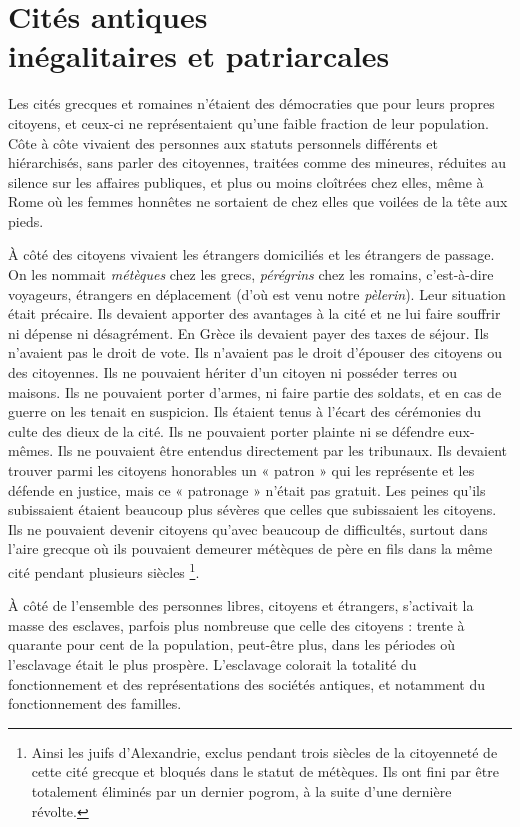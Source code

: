 
\chapter[Cités antiques inégalitaires et patriarcales]{Cités antiques\\inégalitaires et patriarcales}

Les cités grecques et romaines n'étaient des démocraties que pour
leurs propres citoyens, et ceux-ci ne représentaient qu'une faible fraction de leur
population. Côte à côte vivaient des personnes aux statuts personnels
différents et hiérarchisés, sans parler des citoyennes, traitées comme des
mineures, réduites au silence sur les affaires publiques, et plus ou moins
cloîtrées chez elles, même à Rome où les femmes honnêtes ne sortaient
de chez elles que voilées de la tête aux pieds.

À côté des citoyens vivaient les étrangers domiciliés et les étrangers
de passage. On les nommait \emph{métèques} chez les grecs, \emph{pérégrins} chez les
romains, c'est-à-dire voyageurs, étrangers en déplacement (d'où est venu
notre \emph{pèlerin}). Leur situation était précaire. Ils devaient apporter des avantages
à la cité et ne lui faire souffrir ni dépense ni désagrément. En Grèce
ils devaient payer des taxes de séjour. Ils n'avaient pas le droit de vote. Ils
n'avaient pas le droit d'épouser des citoyens ou des citoyennes. Ils ne
pouvaient hériter d'un citoyen ni posséder terres ou maisons. Ils ne pouvaient
porter d'armes, ni faire partie des soldats, et en cas de guerre on
les tenait en suspicion. Ils étaient tenus à l'écart des cérémonies du culte
des dieux de la cité. Ils ne pouvaient porter plainte ni se défendre eux-mêmes.
Ils ne pouvaient être entendus directement par les tribunaux. Ils
devaient trouver parmi les citoyens honorables un « patron » qui les représente
et les défende en justice, mais ce « patronage » n'était pas gratuit.
Les peines qu'ils subissaient étaient beaucoup plus sévères que celles
que subissaient les citoyens. Ils ne pouvaient devenir citoyens qu'avec
beaucoup de difficultés, surtout dans l'aire grecque où ils pouvaient demeurer
métèques de père en fils dans la même cité pendant plusieurs siècles%
\footnote{Ainsi
les juifs d'Alexandrie, exclus pendant trois siècles de la citoyenneté de cette cité grecque et bloqués dans le statut de métèques. Ils ont fini par être totalement éliminés par un dernier pogrom, à la suite d'une dernière révolte.}.

À côté de l'ensemble des personnes libres, citoyens et étrangers,
s'activait la masse des esclaves, parfois plus nombreuse que celle des citoyens :
 trente à quarante pour cent de la population, peut-être plus, dans
les périodes où l'esclavage était le plus prospère. L'esclavage colorait la
totalité du fonctionnement et des représentations des sociétés antiques,
et notamment du fonctionnement des familles.

